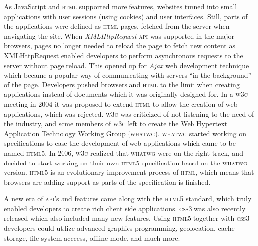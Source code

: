 \documentclass[a4paper,11pt]{kth-mag}
\begin{document}
        As JavaScript and \textsc{html} supported more features, websites turned into small applications with user sessions (using cookies) and user interfaces.
        Still, parts of the applications were defined as \textsc{html} pages, fetched from the server when navigating the site.
        When \emph{XMLHttpRequest} \textsc{api} was supported in the major browsers, pages no longer needed to reload the page to fetch new content as XMLHttpRequest enabled developers to perform asynchronous requests to the server without page reload.
        This opened up for \emph{Ajax} web development technique which became a popular way of communicating with servers ``in the background'' of the page.
        Developers pushed browsers and \textsc{html} to the limit when creating applications instead of documents which it was originally designed for.
        In a \textsc{w3c} meeting in 2004 it was proposed to extend \textsc{html} to allow the creation of web applications, which was rejected.
        \textsc{w3c} was criticized of not listening to the need of the industry, and some members of \textsc{w3c} left to create the Web Hypertext Application Technology Working Group (\textsc{whatwg}).
        \textsc{whatwg} started working on specifications to ease the development of web applications which came to be named \textsc{html5}.
        In 2006, \textsc{w3c} realized that \textsc{whatwg} were on the right track, and decided to start working on their own \textsc{html5} specification based on the \textsc{whatwg} version.
        \textsc{html5} is an evolutionary improvement process of \textsc{html}, which means that browsers are adding support as parts of the specification is finished.

        A new era of \textsc{api}'s and features came along with the \textsc{html5} standard, which truly enabled developers to create rich client side applications.
        \textsc{css3} was also recently released which also included many new features.
        Using \textsc{html5} together with \textsc{css3} developers could utilize advanced graphics programming, geolocation, cache storage, file system acccess, offline mode, and much more.

\end{document}
